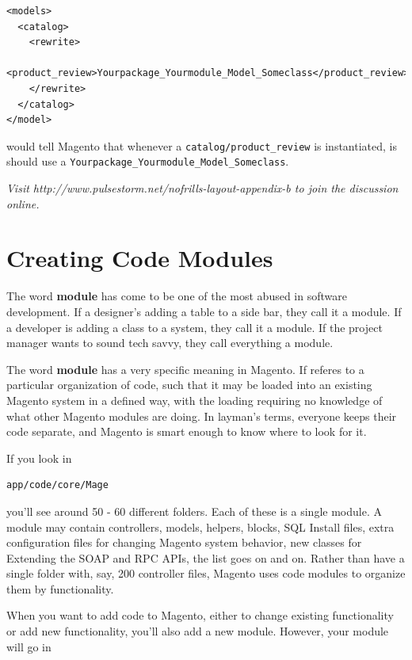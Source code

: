 \documentclass[oneside]{book}
\begin{document}
\begin{lstlisting}
<models>
  <catalog>
    <rewrite>
      <product_review>Yourpackage_Yourmodule_Model_Someclass</product_review>
    </rewrite>
  </catalog>
</model>

\end{lstlisting}


would tell Magento that whenever a \footnotesize\texttt{catalog/product\_review} \normalsize  is instantiated, is should use a \footnotesize\texttt{Yourpackage\_Yourmodule\_Model\_Someclass}\normalsize.

\emph{Visit http://www.pulsestorm.net/nofrills-layout-appendix-b to join the discussion online.}
\chapter{Creating Code Modules}
The word \textbf{module} has come to be one of the most abused in software development.  If a designer's adding a table to a side bar, they call it a module.  If a developer is adding a class to a system, they call it a module.  If the project manager wants to sound tech savvy, they call everything a module.

The word \textbf{module} has a very specific meaning in Magento.  If referes to a particular organization of code, such that it may be loaded into an existing Magento system in a defined way, with the loading requiring no knowledge of what other Magento modules are doing.  In layman's terms, everyone keeps their code separate, and Magento is smart enough to know where to look for it.

If you look in

\begin{lstlisting}
app/code/core/Mage

\end{lstlisting}


you'll see around 50 - 60 different folders.  Each of these is a single module.  A module may contain controllers, models, helpers, blocks, SQL Install files, extra configuration files for changing Magento system behavior, new classes for Extending the SOAP and RPC APIs, the list goes on and on.  Rather than have a single folder with, say, 200 controller files, Magento uses code modules to organize them by functionality.

When you want to add code to Magento, either to change existing functionality or add new functionality, you'll also add a new module.  However, your module will go in
\end{document}
